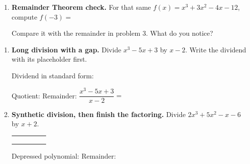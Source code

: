 \documentclass[10pt]{article}
\begin{document}
\begin{tcolorbox}[colback=white, colframe=black!40, title=\textbf{Tier R --- Remediate},
    fonttitle=\bfseries, arc=1.5mm, left=3mm, right=3mm, top=2mm, bottom=2mm, breakable]
\begin{enumerate}[leftmargin=1.7em, itemsep=9pt]
    \vspace{2pt}
    Quotient: \blank{3.0cm} \quad Remainder: \blank{1.2cm}

    \vspace{2pt}
    The quotient is a difference of squares, so factor completely:
    $x^3+3x^2-4x-12 = $ \blank{5.0cm}

  \item \textbf{Remainder Theorem check.} For that same $f(x) = x^3 + 3x^2 - 4x - 12$, compute
    $f(-3) = $ \blank{1.6cm}

    \vspace{2pt}
    Compare it with the remainder in problem 3. What do you notice? \blank{5.4cm}
\end{enumerate}
\end{tcolorbox}

\begin{tcolorbox}[colback=white, colframe=black!40, title=\textbf{Tier A --- Approaching Proficiency},
    fonttitle=\bfseries, arc=1.5mm, left=3mm, right=3mm, top=2mm, bottom=2mm, breakable]
\begin{enumerate}[leftmargin=1.7em, itemsep=10pt]
  \item \textbf{Long division with a gap.} Divide $x^3 - 5x + 3$ by $x - 2$. Write the dividend with
    its placeholder first.

    \vspace{2pt}
    Dividend in standard form: \blank{6.0cm}

    \vspace{2.0in}

    Quotient: \blank{3.0cm} \quad Remainder: \blank{1.2cm} \quad
    $\dfrac{x^3-5x+3}{x-2} = $ \blank{4.6cm}

  \item \textbf{Synthetic division, then finish the factoring.} Divide $2x^3 + 5x^2 - x - 6$ by
    $x + 2$.
    \begin{center}
    \renewcommand{\arraystretch}{1.6}
    \begin{tabular}{r|C{1.4cm}C{1.4cm}C{1.4cm}C{1.4cm}}
        &     &     &     &     \\
        &     &     &     &     \\ 
        &     &     &     &     \\
    \end{tabular}
    \end{center}

    \vspace{2pt}
    Depressed polynomial: \blank{3.0cm} \quad Remainder: \blank{1.2cm}


\end{enumerate}
\end{tcolorbox}
\end{document}
